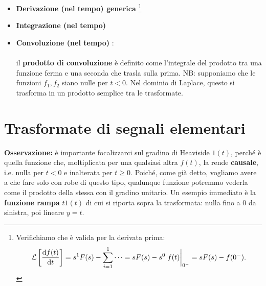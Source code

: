 \begin{itemize}
		\begin{proof}
	Usiamo la definizione di trasformata e applichiamo l'integrazione per parti:
	\begin{align*}
		\lt{\dv{f(t)}{t}} & = \ltint{\dv{f(t)}{t}}{-st}{t}	 = \eval{f(t)e^{-st}}_{0^-}^{\pinf} - \int_{0^-}^{\pinf} f(t)(-s)e^{-st} \dd{t} \\ & = 0 - f(0^-) + \int_{0^-}^{\pinf} sf(t)e^{-st} \dd{t} = - f(0^-) + s \int_{0^-}^{\pinf} f(t)e^{-st} \dd{t} \\ & = - f(0^-) + s \lt{f(t)} = sF(s) - f(0^-).
	\end{align*}
	\end{proof}
	\item \textbf{Derivazione (nel tempo) generica} \rarr {} \footnote{
	Verifichiamo che è valida per la derivata prima:
	\begin{equation*}
		\lt{\dv{f(t)}{t}} = s^1 F(s) - \sum_{i=1}^1 \cdots = s F(s) - s^{0} \eval{f(t)}_{0^-} = sF(s)-f(0^-).
	\end{equation*}}
	\item \textbf{Integrazione (nel tempo)} \rarr {}
\item \textbf{Convoluzione (nel tempo)} \rarr {} : \\ \\ il \textbf{prodotto di convoluzione} è definito come l'integrale del prodotto tra una funzione ferma e una seconda che trasla sulla prima. NB: supponiamo che le funzioni $f_1,f_2$ siano nulle per $t < 0$. Nel dominio di Laplace, questo si trasforma in un prodotto semplice tra le trasformate.
\end{itemize}

\section{Trasformate di segnali elementari}

\bb
\textbf{Osservazione:} è importante focalizzarci sul gradino di Heaviside $1(t)$, perché è quella funzione che, moltiplicata per una qualsiasi altra $f(t)$, la rende \textbf{causale}, i.e. nulla per $t < 0$ e inalterata per $t \geq 0$. Poiché, come già detto, vogliamo avere a che fare solo con robe di questo tipo, qualunque funzione potremmo vederla come il prodotto della stessa con il gradino unitario. Un esempio immediato è la \textbf{funzione rampa} $t1(t)$ di cui si riporta sopra la trasformata: nulla fino a $0$ da sinistra, poi lineare $y=t$. 

